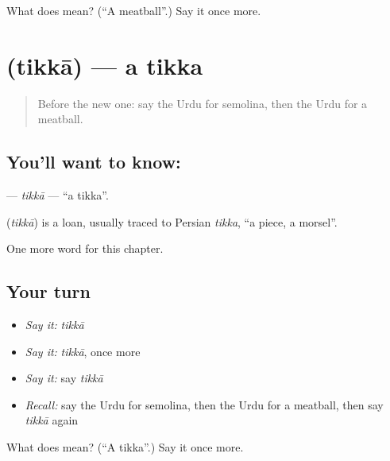 \begin{tcolorbox}[breakable,colback=teal!4,colframe=teal!35!black,title={Before you move on}]
What does  mean? (\textquotedblleft{}A meatball\textquotedblright{}.) Say it once more.
\end{tcolorbox}
\section[\texorpdfstring{\ur{تکہ} (tikkā)}{تکہ (tikkā)}]{ (tikkā) — a tikka}

\label{lesson:UR-C260-tikka}



\begin{quote}
Before the new one: say the Urdu for semolina, then the Urdu for a meatball.
\end{quote}

\subsection*{You'll want to know: }
\textbf{} — \emph{tikkā} — \textquotedblleft{}a tikka\textquotedblright{}.

\begin{cousinweb}
\textbf{} (\emph{tikkā}) is a loan, usually traced to Persian \emph{tikka}, \textquotedblleft{}a piece, a morsel\textquotedblright{}.
\end{cousinweb}

\begin{grammarlens}[title={What you've built}]
One more word for this chapter.
\end{grammarlens}

\subsection*{Your turn}
\begin{itemize}
\raggedright
  \item \emph{Say it:} \emph{tikkā}
  \item \emph{Say it:} \emph{tikkā}, once more
  \item \emph{Say it:} say \emph{tikkā}
  \item \emph{Recall:} say the Urdu for semolina, then the Urdu for a meatball, then say \emph{tikkā} again
\end{itemize}

\begin{tcolorbox}[breakable,colback=teal!4,colframe=teal!35!black,title={Before you move on}]
What does  mean? (\textquotedblleft{}A tikka\textquotedblright{}.) Say it once more.
\end{tcolorbox}
